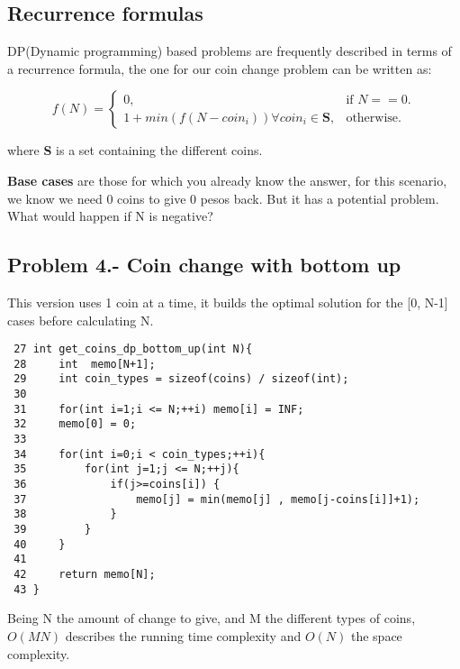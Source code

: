 \documentclass[article]{beamer}
\begin{document}
\subsection{Recurrence formulas}
\begin{frame}[fragile]
	DP(Dynamic programming) based problems are frequently described in terms of a recurrence formula, the one for our coin change problem can be
	written as:
	\vspace{8mm}
	
	\begin{equation}
  	f(N)=\begin{cases}
  	0, & \text{if $N==0$}.\\
    1 + min(f(N-coin_{i})) \forall coin_{i} \in \textbf{S}, & \text{otherwise}.
 	 \end{cases}
	\end{equation} 
	\begin{flushright}
	{\footnotesize  where \textbf{S} is a set containing the different coins.}
	\end{flushright}
	\vspace{5mm}
	
	
	\textbf{Base cases} are those for which you already know the answer, for this scenario, we know we need 0 coins to give 0 pesos back.
	But it has a potential problem. What would happen if N is negative?
\end{frame}

\subsection{Problem 4.- Coin change with bottom up}
\begin{frame}[fragile]
	This version uses 1 coin at a time, it builds the optimal solution for the
	[0, N-1] cases before calculating N. 
	
	{\tiny
		\begin{lstlisting}
 27 int get_coins_dp_bottom_up(int N){
 28     int  memo[N+1];
 29     int coin_types = sizeof(coins) / sizeof(int);
 30 
 31     for(int i=1;i <= N;++i) memo[i] = INF;
 32     memo[0] = 0;
 33 
 34     for(int i=0;i < coin_types;++i){
 35         for(int j=1;j <= N;++j){
 36             if(j>=coins[i]) {
 37                 memo[j] = min(memo[j] , memo[j-coins[i]]+1);
 38             }
 39         }
 40     }
 41 
 42     return memo[N];
 43 }
		\end{lstlisting}
	}
	
	Being N the amount of change to give, and M the different types of coins, $O(MN)$ describes the running time complexity and $O(N)$ the space complexity.
\end{frame}
\end{document}
